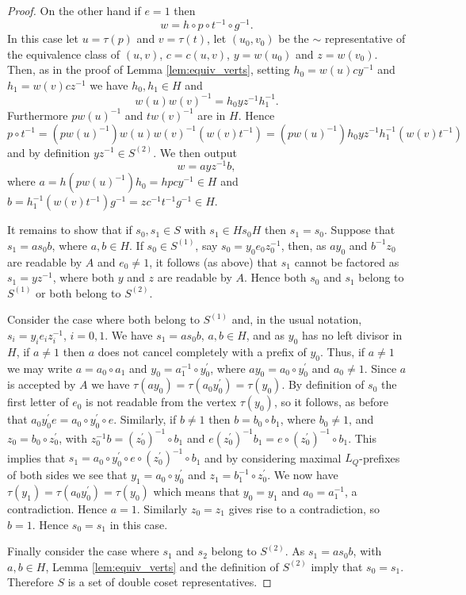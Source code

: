 \documentclass[a4paper,12pt]{article}
\renewcommand{\t}{\tau }
\numberwithin{equation}{section}
\numberwithin{figure}{section}
\begin{document}
\begin{proof}
On the other hand if $e=1$ then
\[w=h\circ p\circ t^{-1}\circ g^{-1}.\]
In this case let $u=\t(p)$ and $v=\t(t)$,
let $(u_0,v_0)$ be the $\sim$ representative
of the equivalence class of $(u,v)$, $c=c(u,v)$,
 $y=w(u_0)$ and $z=w(v_0)$. Then,  as in the proof of Lemma
\ref{lem:equiv_verts}, setting $h_0=w(u)cy^{-1}$ and
$h_1=w(v)cz^{-1}$ we have
 $h_0,h_1\in H$ and
\[w(u)w(v)^{-1}=h_0yz^{-1}h_1^{-1}.\] Furthermore
 $p w(u)^{-1}$ and  $t w(v)^{-1}$ are in $H$. Hence
\[
p\circ t^{-1}=( p w(u)^{-1})w(u)w(v)^{-1}( w(v)t^{-1})=( p w(u)^{-1}) h_0 yz^{-1}
h_1^{-1}( w(v)t^{-1})
\]
and by definition $yz^{-1}\in S^{(2)}$. We then output
\[w=a yz^{-1} b,\]
where $a=h ( p w(u)^{-1}) h_0=hpcy^{-1}\in H$ and $b=h_1^{-1}( w(v)t^{-1})g^{-1}
=zc^{-1}t^{-1}g^{-1}\in H$.

It remains to show that if $s_0,s_1\in S$ with $s_1\in Hs_0H$
then $s_1=s_0$. Suppose that $s_1=as_0b$, where $a, b\in H$. If
$s_0\in S^{(1)}$, say $s_0=y_0e_0z_0^{-1}$, then, as $ay_0$ and
$b^{-1}z_0$ are readable by $A$ and $e_0\neq 1$, it follows (as
above) that $s_1$ cannot be factored as $s_1=yz^{-1}$, where both
$y$ and $z$ are readable by $A$. Hence both $s_0$ and $s_1$ belong
to $S^{(1)}$ or both belong to $S^{(2)}$.

Consider the case where both belong to $S^{(1)}$ and, in the usual notation,
$s_i=y_i e_i z_i^{-1}$, $i=0,1$. We have $s_1=as_0b$, $a,b\in H$, and as $y_0$ has
no left divisor in $H$, if $a\neq 1$ then $a$ does not cancel completely with
 a prefix of $y_0$. Thus, if $a\neq 1$ we may write $a=a_0\circ a_1$ and
$y_0=a_1^{-1}\circ y_0^\prime$, where $ay_0=a_0\circ y_0^\prime$ 
and $a_0\neq 1$. Since
$a$ is accepted by $A$ we have $\t(ay_0)=\t(a_0y_0^\prime)=\t(y_0)$. By definition
of $s_0$ the first letter of $e_0$ is not readable from the vertex $\t(y_0)$, so
it follows, as before that $a_0y_0^\prime e=a_0\circ y_0^\prime \circ e$. Similarly,
if $b\neq 1$ then $b=b_0\circ b_1$, where $b_0\neq 1$,  and $z_0=b_0\circ z_0^\prime$, with
$z_0^{-1}b= (z_0^\prime)^{-1}\circ b_1$ and $e (z_0^\prime)^{-1}b_1=
e\circ  (z_0^\prime)^{-1}\circ b_1$. This implies that
$s_1=a_0\circ y_0^\prime \circ  e\circ  (z_0^\prime)^{-1}\circ b_1$ and by considering
maximal $L_Q$-prefixes of both sides we see that $y_1=a_0\circ y_0^\prime$ and
$z_1=b_1^{-1}\circ z_0^\prime$. We now have  $\t(y_1)=\t(a_0y_0^\prime)=\t(y_0)$ which
 means that
$y_0=y_1$ and $a_0=a_1^{-1}$,  a contradiction. Hence $a=1$. 
Similarly $z_0=z_1$ gives rise to  a contradiction, so $b=1$.
Hence $s_0=s_1$ in this case.

Finally consider the case where $s_1$ and $s_2$ belong to
$S^{(2)}$. As $s_1=as_0b$, with $a,b\in H$, Lemma
\ref{lem:equiv_verts} and the definition of $S^{(2)}$ imply  that
$s_0= s_1$. Therefore $S$ is a set of double coset
representatives.
\end{proof}
\end{document}
